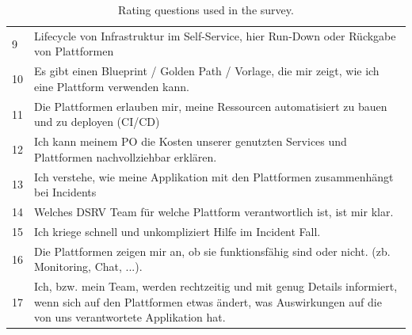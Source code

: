 \documentclass[a4paper,10pt]{article}
\begin{document}
\begin{table}[!htbp]
\begin{center}
\begin{tabularx}{\textwidth}{lX}
                9  & Lifecycle von Infrastruktur im Self-Service, hier Run-Down oder Rückgabe von Plattformen                                                                                              \\
                10 & Es gibt einen Blueprint / Golden Path / Vorlage, die mir zeigt, wie ich eine Plattform verwenden kann.                                                                                \\
                11 & Die Plattformen erlauben mir, meine Ressourcen automatisiert zu bauen und zu deployen (CI/CD)                                                                                         \\
                12 & Ich kann meinem PO die Kosten unserer genutzten Services und Plattformen nachvollziehbar erklären.                                                                                    \\
                13 & Ich verstehe, wie meine Applikation mit den Plattformen zusammenhängt bei Incidents                                                                                                   \\
                14 & Welches DSRV Team für welche Plattform verantwortlich ist, ist mir klar.                                                                                                              \\
                15 & Ich kriege schnell und unkompliziert Hilfe im Incident Fall.                                                                                                                          \\
                16 & Die Plattformen zeigen mir an, ob sie funktionsfähig sind oder nicht. (zb. Monitoring, Chat, ...).                                                                                    \\
                17 & Ich, bzw. mein Team, werden rechtzeitig und mit genug Details informiert, wenn sich auf den Plattformen etwas ändert, was Auswirkungen auf die von uns verantwortete Applikation hat. \\
                \bottomrule
            \end{tabularx}
        \end{center}
        \caption{\label{tab:ratingquestionstable} Rating questions used in the survey.}
    \end{table}
\end{document}

